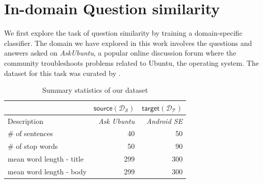 \documentclass{sigkddExp}
\begin{document}
\section{In-domain Question similarity}
\label{in_domain}
We first explore the task of question similarity by training a domain-specific classifier. The domain we have explored in this work involves the questions and answers asked on \textit{AskUbuntu}, a popular online discussion forum where the community troubleshoots problems related to Ubuntu, the operating system. The dataset for this task was curated by \cite{lei2015semi}. 

\begin{table}[h]
\begin{tabular}{l|r|r}
     
     & $\mathsf{source} (\mathcal{D_S})$
     & $\mathsf{target} (\mathcal{D_T})$
     \\
     \toprule
     Description
     & \textit{Ask Ubuntu}
     & \textit{Android SE}
     \\
     \# of sentences
     & 40
     & 50
     \\
     \# of stop words 
     & 50
     & 90
     \\
     mean word length - title
     & 299
     & 300
     \\
     mean word length - body
     & 299
     & 300
\end{tabular}
\caption{Summary statistics of our dataset}
\label{tab:dataset}
\end{table}
\end{document}
